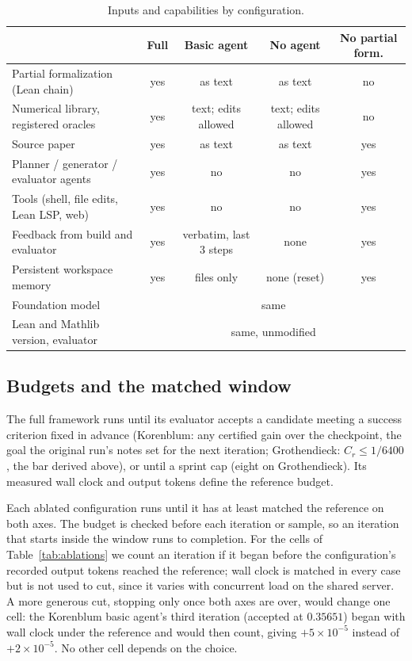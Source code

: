 \begin{table}[t]
\centering
\footnotesize
\setlength{\tabcolsep}{3.5pt}
\begin{tabular}{@{}lcccc@{}}
\toprule
& Full & Basic agent & No agent & No partial form. \\
\midrule
Partial formalization (Lean chain)        & yes & as text & as text & no \\
Numerical library, registered oracles     & yes & text; edits allowed & text; edits allowed & no \\
Source paper                              & yes & as text & as text & yes \\
Planner / generator / evaluator agents    & yes & no  & no  & yes \\
Tools (shell, file edits, Lean LSP, web)  & yes & no  & no  & yes \\
Feedback from build and evaluator         & yes & verbatim, last 3 steps & none & yes \\
Persistent workspace memory               & yes & files only & none (reset) & yes \\
Foundation model                          & \multicolumn{4}{c}{same} \\
Lean and Mathlib version, evaluator       & \multicolumn{4}{c}{same, unmodified} \\
\bottomrule
\end{tabular}
\caption{Inputs and capabilities by configuration.}
\label{tab:capabilities}
\end{table}

\subsection{Budgets and the matched window}

The full framework runs until its evaluator accepts a candidate meeting a
success criterion fixed in advance (Korenblum: any certified gain over the
checkpoint, the goal the original run's notes set for the next iteration;
Grothendieck: $C_r \le 1/6400$, the bar derived above), or until a sprint cap
(eight on Grothendieck). Its measured wall clock and output tokens define the
reference budget.

Each ablated configuration runs until it has at least matched the reference on
both axes. The budget is checked before each iteration or sample, so an
iteration that starts inside the window runs to completion. For the cells of
Table~\ref{tab:ablations} we count an iteration if it began before the
configuration's recorded output tokens reached the reference; wall clock is
matched in every case but is not used to cut, since it varies with concurrent
load on the shared server. A more generous cut, stopping only once both axes
are over, would change one cell: the Korenblum basic agent's third iteration
(accepted at $0.35651$) began with wall clock under the reference and would
then count, giving $+5\times10^{-5}$ instead of $+2\times10^{-5}$. No other
cell depends on the choice.

